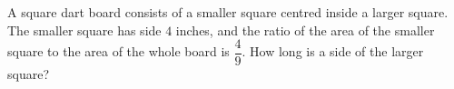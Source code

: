 A square dart board consists of a smaller square centred inside a larger square. The smaller square has side $4$ inches, and the ratio of the area of the smaller square to the area of the whole board is $\dfrac49$. How long is a side of the larger square?
